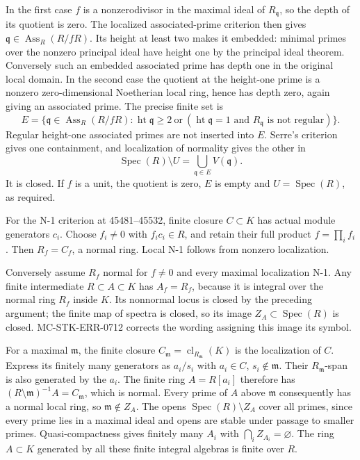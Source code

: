 In the first case \(f\) is a nonzerodivisor in the maximal ideal of \(R_{\mathfrak q}\), so the depth of its quotient is zero. The localized associated-prime criterion then gives \(\mathfrak q\in\operatorname{Ass}_R(R/fR)\). Its height at least two makes it embedded: minimal primes over the nonzero principal ideal have height one by the principal ideal theorem. Conversely such an embedded associated prime has depth one in the original local domain. In the second case the quotient at the height-one prime is a nonzero zero-dimensional Noetherian local ring, hence has depth zero, again giving an associated prime. The precise finite set is \[
 E=\{\mathfrak q\in\operatorname{Ass}_R(R/fR):
 \operatorname{ht}\mathfrak q\geq2\ \text{or}\
 (\operatorname{ht}\mathfrak q=1\text{ and }R_{\mathfrak q}\text{ is not regular})\}.
\] Regular height-one associated primes are not inserted into \(E\). Serre's criterion gives one containment, and localization of normality gives the other in \[
 \operatorname{Spec}(R)\setminus U=\bigcup_{\mathfrak q\in E}V(\mathfrak q).
\] It is closed. If \(f\) is a unit, the quotient is zero, \(E\) is empty and \(U=\operatorname{Spec}(R)\), as required.

For the N-1 criterion at 45481--45532, finite closure \(C\subset K\) has actual module generators \(c_i\). Choose \(f_i\ne0\) with \(f_ic_i\in R\), and retain their full product \(f=\prod_i f_i\). Then \(R_f=C_f\), a normal ring. Local N-1 follows from nonzero localization.

Conversely assume \(R_f\) normal for \(f\ne0\) and every maximal localization N-1. Any finite intermediate \(R\subset A\subset K\) has \(A_f=R_f\), because it is integral over the normal ring \(R_f\) inside \(K\). Its nonnormal locus is closed by the preceding argument; the finite map of spectra is closed, so its image \(Z_A\subset\operatorname{Spec}(R)\) is closed. MC-\AlgebraIdentifierBreak{}STK-\AlgebraIdentifierBreak{}ERR-\AlgebraIdentifierBreak{}0712 corrects the wording assigning this image its symbol.

For a maximal \(\mathfrak m\), the finite closure \(C_{\mathfrak m}=\operatorname{cl}_{R_{\mathfrak m}}(K)\) is the localization of \(C\). Express its finitely many generators as \(a_i/s_i\) with \(a_i\in C\), \(s_i\notin\mathfrak m\). Their \(R_{\mathfrak m}\)-span is also generated by the \(a_i\). The finite ring \(A=R[a_i]\) therefore has \((R\setminus\mathfrak m)^{-1}A=C_{\mathfrak m}\), which is normal. Every prime of \(A\) above \(\mathfrak m\) consequently has a normal local ring, so \(\mathfrak m\notin Z_A\). The opens \(\operatorname{Spec}(R)\setminus Z_A\) cover all primes, since every prime lies in a maximal ideal and opens are stable under passage to smaller primes. Quasi-compactness gives finitely many \(A_i\) with \(\bigcap_i Z_{A_i}=\varnothing\). The ring \(A\subset K\) generated by all these finite integral algebras is finite over \(R\).

